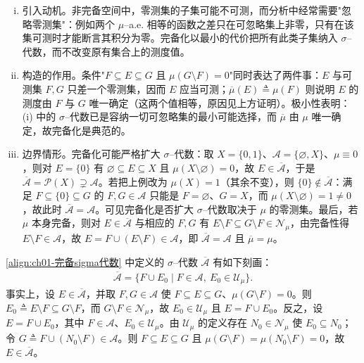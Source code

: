 \documentclass[../../main.tex]{subfiles}%
\begin{document}
\begin{remark}\label{remark:ch01-完备化动机}
\begin{enumerate}[(i)]
\item 引入动机。非完备空间中，零测集的子集可能不可测，而分析中经常需要"忽略零测集"：例如两个 $\mu$--a.e. 相等的函数之差只在可忽略集上非零，只有在该集可测时才能断言其积分为零。完备化以最小的代价把所有此类子集纳入 $\sigma$--代数，而不改变原有集合上的测度值。
\item 构造的作用。条件"$F\subseteq E\subseteq G$ 且 $\mu(G\setminus F)=0$"同时表达了两件事：$E$ 与可测集 $F,G$ 只差一个零测集，因而 $E$ 应当可测；$\overline{\mu}(E)\triangleq\mu(F)$ 则说明 $E$ 的测度由 $F$ 与 $G$ 唯一确定（这两个值相等，原因见上方证明）。极小性表明：(i) 中的 $\sigma$--代数已是容纳一切可忽略集的最小可能选择，而 $\overline{\mu}$ 由 $\mu$ 唯一确定，故完备化是典范的。
\item 边界情形。完备化可能严格扩大 $\sigma$--代数：取 $X=\{0,1\}$、$\mathcal{A}=\{\varnothing ,X\}$、$\mu\equiv0$，则对 $E=\{0\}$ 有 $\varnothing \subseteq E\subseteq X$ 且 $\mu(X\setminus\varnothing )=0$，故 $E\in\overline{\mathcal{A}}$，于是 $\overline{\mathcal{A}}=\mathcal{P}(X)\supsetneq\mathcal{A}$。若把上例改为 $\mu(X)=1$（其余不变），则 $\{0\}\notin\overline{\mathcal{A}}$：满足 $F\subseteq\{0\}\subseteq G$ 的 $F,G\in\mathcal{A}$ 只能是 $F=\varnothing$、$G=X$，而 $\mu(X\setminus\varnothing )=1\neq0$，故此时 $\overline{\mathcal{A}}=\mathcal{A}$。可见完备化是否扩大 $\sigma$--代数取决于 $\mu$ 的零测集。最后，若 $\mu$ 本身完备，则对 $E\in\overline{\mathcal{A}}$ 与相应的 $F,G$ 有 $E\setminus F\subseteq G\setminus F\in\mathcal{N}_\mu$，由完备性得 $E\setminus F\in\mathcal{A}$，故 $E=F\cup(E\setminus F)\in\mathcal{A}$，即 $\overline{\mathcal{A}}=\mathcal{A}$ 且 $\overline{\mu}=\mu$。
\end{enumerate}
\end{remark}

\begin{remark}\label{remark:ch01-完备化刻画}
\eqref{align:ch01-完备sigma代数} 中定义的 $\sigma$--代数 $\overline{\mathcal{A}}$ 有如下刻画：
\begin{align*}
\overline{\mathcal{A}}=\{F\cup E_0\mid F\in\mathcal{A},\ E_0\in\mathcal{U}_\mu\}.
\end{align*}
事实上，设 $E\in\overline{\mathcal{A}}$，并取 $F,G\in\mathcal{A}$ 使 $F\subseteq E\subseteq G$、$\mu(G\setminus F)=0$。则 $E_0\triangleq E\setminus F\subseteq G\setminus F$，而 $G\setminus F\in\mathcal{N}_\mu$，故 $E_0\in\mathcal{U}_\mu$ 且 $E=F\cup E_0$。反之，设 $E=F\cup E_0$，其中 $F\in\mathcal{A}$、$E_0\in\mathcal{U}_\mu$。由 $\mathcal{U}_\mu$ 的定义存在 $N_0\in\mathcal{N}_\mu$ 使 $E_0\subseteq N_0$；令 $G\triangleq F\cup(N_0\setminus F)\in\mathcal{A}$。则 $F\subseteq E\subseteq G$ 且 $\mu(G\setminus F)=\mu(N_0\setminus F)=0$，故 $E\in\overline{\mathcal{A}}$。
\end{remark}
\end{document}
